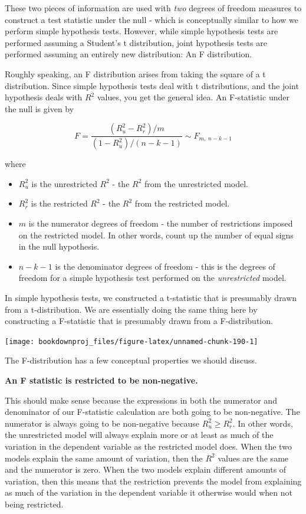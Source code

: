 \documentclass[
]{book}
\begin{document}
These two pieces of information are used with \emph{two} degrees of freedom measures to construct a test statistic under the null - which is conceptually similar to how we perform simple hypothesis tests. However, while simple hypothesis tests are performed assuming a Student's t distribution, joint hypothesis tests are performed assuming an entirely new distribution: An F distribution.

Roughly speaking, an F distribution arises from taking the square of a t distribution. Since simple hypothesis tests deal with t distributions, and the joint hypothesis deals with \(R^2\) values, you get the general idea. An F-statistic under the null is given by

\[F=\frac{(R^2_u - R^2_r)/m}{(1-R^2_u)/(n-k-1)} \sim F_{m,\;n-k-1}\]

where

\begin{itemize}
\item
  \(R^2_u\) is the unrestricted \(R^2\) - the \(R^2\) from the unrestricted model.
\item
  \(R^2_r\) is the restricted \(R^2\) - the \(R^2\) from the restricted model.
\item
  \(m\) is the numerator degrees of freedom - the number of restrictions imposed on the restricted model. In other words, count up the number of equal signs in the null hypothesis.
\item
  \(n-k-1\) is the denominator degrees of freedom - this is the degrees of freedom for a simple hypothesis test performed on the \emph{unrestricted} model.
\end{itemize}

In simple hypothesis tests, we constructed a t-statistic that is presumably drawn from a t-distribution. We are essentially doing the same thing here by constructing a F-statistic that is presumably drawn from a F-distribution.

\begin{center}\texttt{[image: bookdownproj\_files/figure-latex/unnamed-chunk-190-1]} \end{center}

The F-distribution has a few conceptual properties we should discuss.

\textbf{An F statistic is restricted to be non-negative.}

This should make sense because the expressions in both the numerator and denominator of our F-statistic calculation are both going to be non-negative. The numerator is always going to be non-negative because \(R^2_u \geq R^2_r\). In other words, the unrestricted model will always explain more or at least as much of the variation in the dependent variable as the restricted model does. When the two models explain the same amount of variation, then the \(R^2\) values are the same and the numerator is zero. When the two models explain different amounts of variation, then this means that the restriction prevents the model from explaining as much of the variation in the dependent variable it otherwise would when not being restricted.
\end{document}
